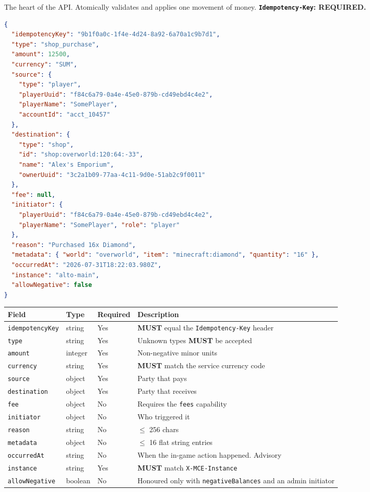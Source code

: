 \documentclass[11pt,a4paper]{article}
\newcommand{\code}[1]{\texttt{\small #1}}
\newcommand{\req}{\textbf{MUST}}
\begin{document}
The heart of the API. Atomically validates and applies one movement of money.
\textbf{\code{Idempotency-Key}: REQUIRED.}

\begin{lstlisting}[language=json]
{
  "idempotencyKey": "9b1f0a0c-1f4e-4d24-8a92-6a70a1c9b7d1",
  "type": "shop_purchase",
  "amount": 12500,
  "currency": "SUM",
  "source": {
    "type": "player",
    "playerUuid": "f84c6a79-0a4e-45e0-879b-cd49ebd4c4e2",
    "playerName": "SomePlayer",
    "accountId": "acct_10457"
  },
  "destination": {
    "type": "shop",
    "id": "shop:overworld:120:64:-33",
    "name": "Alex's Emporium",
    "ownerUuid": "3c2a1b09-77aa-4c11-9d0e-51ab2c9f0011"
  },
  "fee": null,
  "initiator": {
    "playerUuid": "f84c6a79-0a4e-45e0-879b-cd49ebd4c4e2",
    "playerName": "SomePlayer", "role": "player"
  },
  "reason": "Purchased 16x Diamond",
  "metadata": { "world": "overworld", "item": "minecraft:diamond", "quantity": "16" },
  "occurredAt": "2026-07-31T18:22:03.980Z",
  "instance": "alto-main",
  "allowNegative": false
}
\end{lstlisting}

\begin{tabularx}{\linewidth}{L{3.3cm} L{1.7cm} L{1.7cm} X}
\toprule
\textbf{Field} & \textbf{Type} & \textbf{Required} & \textbf{Description}\\
\midrule
\code{idempotencyKey} & string  & Yes & \req{} equal the \code{Idempotency-Key} header\\
\code{type}           & string  & Yes & Unknown types \req{} be accepted\\
\code{amount}         & integer & Yes & Non-negative minor units\\
\code{currency}       & string  & Yes & \req{} match the service currency code\\
\code{source}         & object  & Yes & Party that pays\\
\code{destination}    & object  & Yes & Party that receives\\
\code{fee}            & object  & No  & Requires the \code{fees} capability\\
\code{initiator}      & object  & No  & Who triggered it\\
\code{reason}         & string  & No  & $\leq$ 256 chars\\
\code{metadata}       & object  & No  & $\leq$ 16 flat string entries\\
\code{occurredAt}     & string  & No  & When the in-game action happened. Advisory\\
\code{instance}       & string  & Yes & \req{} match \code{X-MCE-Instance}\\
\code{allowNegative}  & boolean & No  & Honoured only with \code{negativeBalances} and an admin initiator\\
\bottomrule
\end{tabularx}
\end{document}
